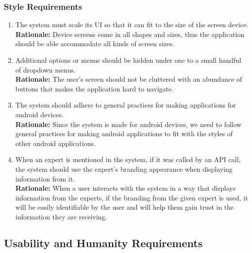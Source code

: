 \documentclass[]{article}
\begin{document}
\subsubsection{Style Requirements}
\label{ssub:style_requirements}
\begin{enumerate}[label={LF-S\arabic*.}]
	\item The system must scale its UI so that it can fit to the size of the screen device.\\
	\textbf{Rationale:} Device screens come in all shapes and sizes, thus the application should be able accommodate all kinds of screen sizes.
	\item Additional options or menus should be hidden under one to a small handful of dropdown menus.\\
	\textbf{Rationale:} The user's screen should not be cluttered with an abundance of buttons that makes the application hard to navigate.
	\item The system should adhere to general practices for making applications for android devices.\\
	\textbf{Rationale:} Since the system is made for android devices, we need to follow general practices for making android applications to fit with the styles of other android applications.
	\item When an expert is mentioned in the system, if it was called by an API call, the system should use the expert's branding appearance when displaying information from it.\\
	\textbf{Rationale:} When a user interacts with the system in a way that displays information from the experts, if the branding from the given expert is used, it will be easily identifiable by the user and will help them gain trust in the information they are receiving.

\end{enumerate}


\subsection{Usability and Humanity Requirements}
\label{sub:usability_and_humanity_requirements}
\end{document}
